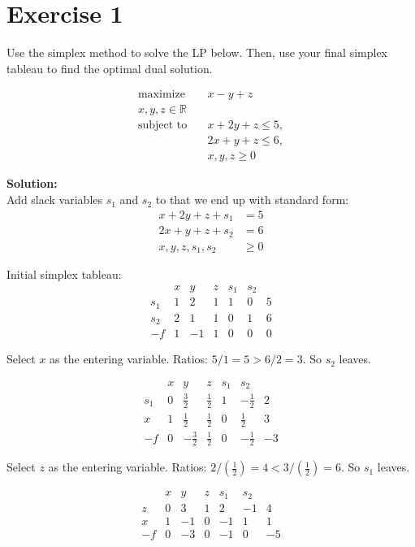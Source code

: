 \documentclass{article}
\begin{document}
\section*{Exercise 1}
Use the simplex method to solve the LP below. Then, use your final simplex tableau to find the optimal dual solution.

\begin{align*}
\text{maximize} \quad & x - y + z\\
x, y, z \in \mathbb{R} \quad & \\
\text{subject to} \quad & x + 2y + z \leq 5,\\
& 2x + y + z \leq 6,\\
& x, y, z \geq 0
\end{align*}

\textbf{Solution:} \\

Add slack variables $s_1$ and $s_2$ to that we end up with standard form:
\begin{align*}
x + 2y + z + s_1 &= 5\\
2x + y + z + s_2 &= 6\\
x, y, z, s_1, s_2 &\geq 0
\end{align*}

Initial simplex tableau:
$$
\begin{array}{c|ccccc|c}
 & x & y & z & s_1 & s_2 &  \\
\hline
s_1 & 1 & 2 & 1 & 1 & 0 & 5 \\
s_2 & 2 & 1 & 1 & 0 & 1 & 6 \\
\hline
-f & 1 & -1 & 1 & 0 & 0 & 0
\end{array}
$$

Select $x$ as the entering variable. Ratios: $5/1 = 5 > 6/2 = 3$. So $s_2$ leaves.

$$
\begin{array}{c|ccccc|c}
 & x & y & z & s_1 & s_2 &  \\
\hline
s_1 & 0 & \frac{3}{2} & \frac{1}{2} & 1 & -\frac{1}{2} & 2 \\
x & 1 & \frac{1}{2} & \frac{1}{2} & 0 & \frac{1}{2} & 3 \\
\hline
-f & 0 & -\frac{3}{2} & \frac{1}{2} & 0 & -\frac{1}{2} & -3
\end{array}
$$

Select $z$ as the entering variable. Ratios: $2/(\frac{1}{2}) = 4 < 3/(\frac{1}{2}) = 6$. So $s_1$ leaves.

$$
\begin{array}{c|ccccc|c}
 & x & y & z & s_1 & s_2 &  \\
\hline
z & 0 & 3 & 1 & 2 & -1 & 4 \\
x & 1 & -1 & 0 & -1 & 1 & 1 \\
\hline
-f & 0 & -3 & 0 & -1 & 0 & -5
\end{array}
$$
\end{document}
